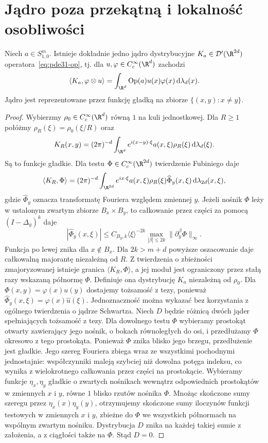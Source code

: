 \section{Jądro poza przekątną i lokalność osobliwości}
\begin{stwierdzenie}
\label{prop:pde31-kernel}
Niech $a\in S^m_{1,0}$. Istnieje dokładnie jedno jądro dystrybucyjne
$K_a\in\mathcal D'(\R^{2d})$ operatora~\eqref{eq:pde31-op},
tj. dla $u,\varphi\in C_c^\infty(\R^d)$ zachodzi
\[
 \langle K_a,\varphi\otimes u\rangle
 =\int_{\R^d}\operatorname{Op}(a)u(x)\varphi(x)
 \,\mathrm d\lambda_d(x).
\]
Jądro jest reprezentowane przez funkcję gładką
na zbiorze $\{(x,y):x\ne y\}$.
\end{stwierdzenie}
\begin{proof}
Wybierzmy $\rho_0\in C_c^\infty(\R^d)$ równą $1$
na kuli jednostkowej. Dla $R\ge1$ połóżmy
$\rho_R(\xi)=\rho_0(\xi/R)$ oraz
\[
 K_R(x,y)=(2\pi)^{-d}\int_{\R^d}
 e^{i(x-y)\cdot\xi}a(x,\xi)\rho_R(\xi)
 \,\mathrm d\lambda_d(\xi).
\]
Są to funkcje gładkie. Dla testu
$\Phi\in C_c^\infty(\R^{2d})$ twierdzenie Fubiniego daje
\[
 \langle K_R,\Phi\rangle=(2\pi)^{-d}
 \int_{\R^{2d}} e^{ix\cdot\xi}a(x,\xi)\rho_R(\xi)
 \widehat\Phi_y(x,\xi)\,\mathrm d\lambda_{2d}(x,\xi),
\]
gdzie $\widehat\Phi_y$ oznacza transformatę Fouriera
względem zmiennej $y$.
Jeżeli nośnik $\Phi$ leży w ustalonym zwartym
zbiorze $B_x\times B_y$, to całkowanie przez części
za pomocą $(I-\Delta_y)^k$ daje
\[
 |\widehat\Phi_y(x,\xi)|
 \le C_{B_y,k}\langle\xi\rangle^{-2k}
 \max_{|\beta|\le2k}\|\partial_y^\beta\Phi\|_\infty.
\]
Funkcja po lewej znika dla $x\notin B_x$.
Dla $2k>m+d$ powyższe oszacowanie daje całkowalną
majorantę niezależną od $R$. Z twierdzenia
o zbieżności zmajoryzowanej istnieje granica
$\langle K_R,\Phi\rangle$, a jej moduł jest ograniczony
przez stałą razy wskazaną półnormę $\Phi$.
Definiuje ona dystrybucję $K_a$ niezależną od $\rho_0$.
Dla $\Phi(x,y)=\varphi(x)u(y)$ dostajemy tożsamość
z tezy, ponieważ
$\widehat\Phi_y(x,\xi)=\varphi(x)\widehat u(\xi)$.
Jednoznaczność można wykazać bez korzystania
z ogólnego twierdzenia o jądrze Schwartza.
Niech $D$ będzie różnicą dwóch jąder spełniających
tożsamość z tezy. Dla dowolnego testu $\Phi$
wybieramy prostokąt otwarty zawierający jego
nośnik, o bokach równoległych do osi, i przedłużamy
$\Phi$ okresowo z tego prostokąta. Ponieważ
$\Phi$ znika blisko jego brzegu, przedłużenie
jest gładkie. Jego szereg Fouriera zbiega wraz
ze wszystkimi pochodnymi jednostajnie:
współczynniki maleją szybciej niż dowolna
potęga indeksu, co wynika z wielokrotnego
całkowania przez części na prostokącie.
Wybieramy funkcje $\eta_x,\eta_y$ gładkie
o zwartych nośnikach wewnątrz odpowiednich
prostokątów w zmiennych $x$ i $y$, równe $1$
blisko rzutów nośnika $\Phi$.
Mnożąc skończone sumy szeregu przez
$\eta_x(x)\eta_y(y)$, otrzymujemy skończone
sumy iloczynów funkcji testowych w zmiennych
$x$ i $y$, zbieżne do $\Phi$ we wszystkich
półnormach na wspólnym zwartym nośniku.
Dystrybucja $D$ znika na każdej takiej sumie
z założenia, a z ciągłości także na $\Phi$.
Stąd $D=0$.


\end{proof}
